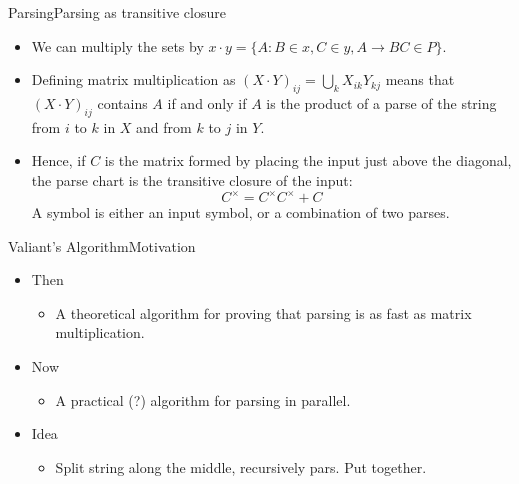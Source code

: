 \documentclass[14pt, notes=hide]{beamer}
\newcommand{\trc}[1]{#1^{\times}}
\begin{document}
\begin{frame}{Parsing}{Parsing as transitive closure}
  \begin{itemize}
  \item We can multiply the sets by $x \cdot y = \{A : B \in x, C \in y, A \to BC \in P \}$.
    \pause
  \item Defining matrix multiplication as $(X \cdot Y)_{i j} = \bigcup_k X_{i k} Y_{k j}$ means that $(X \cdot Y)_{i j}$ contains $A$ if and only if $A$ is the product of a parse of the string from $i$ to $k$ in $X$ and from $k$ to $j$ in $Y$.
    \pause
    \item Hence, if $C$ is the matrix formed by placing the input just above the diagonal, the parse chart is the transitive closure of the input:
      \begin{equation*}
        \trc{C} = \trc{C}\trc{C} + C
      \end{equation*}
      A symbol is either an input symbol, or a combination of two parses.
  \end{itemize}
\end{frame}

\begin{frame}{Valiant's Algorithm}{Motivation} %
\begin{itemize}
  \item Then
    \begin{itemize}
    \item A theoretical algorithm for proving that parsing is as fast as matrix multiplication.
    \end{itemize}
  \item Now
    \begin{itemize}
    \item A practical (?) algorithm for parsing in parallel.
    \end{itemize}
  \item Idea
    \begin{itemize}
    \item Split string along the middle, recursively pars. Put together.
    \end{itemize}
\end{itemize}
\end{frame} %
\end{document}
